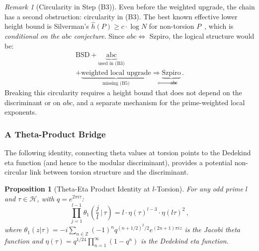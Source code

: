 \documentclass[aps,prd,twocolumn,superscriptaddress,nofootinbib,floatfix]{revtex4-2}
\newtheorem{proposition}[theorem]{Proposition}
\theoremstyle{definition}
\theoremstyle{remark}
\newtheorem{remark}[theorem]{Remark}
\begin{document}
\begin{remark}[Circularity in Step (B3)]
\label{rem:szpiro_circularity}
Even before the weighted upgrade, the chain has a second obstruction: circularity in (B3).  The best known effective lower height bound is Silverman's $\hat{h}(P) \geq c \cdot \log N$ for non-torsion $P$~\cite{Silverman2009}, which is \textit{conditional on the $abc$ conjecture}.  Since $abc \Leftrightarrow$ Szpiro, the logical structure would be:
\[
\begin{gathered}
\text{BSD} + \underbrace{\text{abc}}_{\text{used in (B3)}} \\
+ \underbrace{\text{weighted local upgrade}}_{\text{missing (B5)}}
\Longrightarrow
\underbrace{\text{Szpiro}}_{\Leftrightarrow\, \text{abc}}\,.
\end{gathered}
\]
Breaking this circularity requires a height bound that does not depend on the discriminant or on $abc$, and a separate mechanism for the prime-weighted local exponents.
\end{remark}

\subsubsection{A Theta-Product Bridge}

The following identity, connecting theta values at torsion points to the Dedekind eta function (and hence to the modular discriminant), provides a potential non-circular link between torsion structure and the discriminant.


\begin{proposition}[Theta-Eta Product Identity at $l$-Torsion]
\label{prop:theta_eta}
For any odd prime $l$ and $\tau \in \mathcal{H}$, with $q = e^{2\pi i \tau}$:
\begin{equation}
\prod_{j=1}^{l-1} \theta_1\!\left(\frac{j}{l} \,\bigg|\, \tau\right) = l \cdot \eta(\tau)^{l-3} \cdot \eta(l\tau)^2\,,
\label{eq:theta_eta_identity}
\end{equation}
where $\theta_1(z|\tau) = -i \sum_{n \in \mathbb{Z}} (-1)^n q^{(n+1/2)^2/2} e^{(2n+1)\pi i z}$ is the Jacobi theta function and $\eta(\tau) = q^{1/24} \prod_{n=1}^{\infty}(1-q^n)$ is the Dedekind eta function.
\end{proposition}
\end{document}
